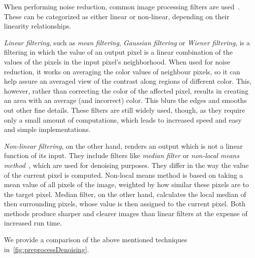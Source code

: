 When performing noise reduction, common image processing filters are used~\citep{denoisingTechniques}. These can be categorized as either linear or non-linear, depending on their linearity relationships.

\emph{Linear filtering}, such as \emph{mean filtering}, \emph{Gaussian filtering} or \emph{Wiener filtering}, is a filtering in which the value of an output pixel is a linear combination of the values of the pixels in the input pixel's neighborhood. When used for noise reduction, it works on averaging the color values of neighbour pixels, so it can help assure an averaged view of the contrast along regions of different color. This, however, rather than correcting the color of the affected pixel, results in creating an area with an average (and incorrect) color. This blurs the edges and smooths out other fine details. These filters are still widely used, though, as they require only a small amount of computations, which leads to increased speed and easy and simple implementations.

\emph{Non-linear filtering}, on the other hand, renders an output which is not a linear function of its input. They include filters like \emph{median filter} or \emph{non-local means method}~\citep{nonLocalMeans}, which are used for denoising purposes. They differ in the way the value of the current pixel is computed. Non-local means method is based on taking a mean value of all pixels of the image, weighted by how similar these pixels are to the target pixel. Median filter, on the other hand, calculates the local median of then surrounding pixels, whose value is then assigned to the current pixel. Both methods produce sharper and clearer images than linear filters at the expense of increased run time.

We provide a comparison of the above mentioned techniques in~\cref{fig:preprocessDenoising}.

